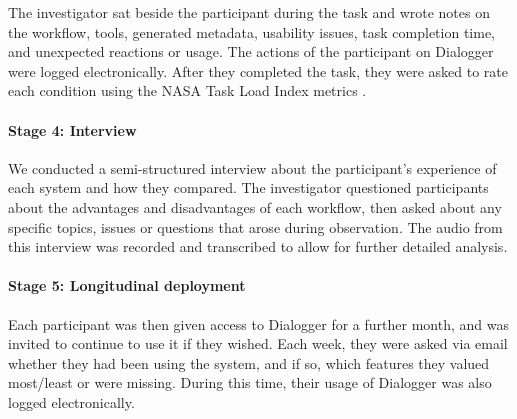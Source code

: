     The investigator sat beside the participant during the task and wrote notes on the workflow, tools, generated
    metadata, usability issues, task completion time, and unexpected reactions or usage.
    The actions of the participant on Dialogger were logged electronically. After they completed the task, they were
    asked to rate each condition using the NASA Task Load Index metrics \citep{Hart1988}.


\paragraph{Stage 4: Interview}
    We conducted a semi-structured interview about the participant's experience of each system and how they compared.
    The investigator questioned participants about the advantages and disadvantages of each workflow, then asked about
    any specific topics, issues or questions that arose during observation. The audio from this interview was
    recorded and transcribed to allow for further detailed analysis.


\paragraph{Stage 5: Longitudinal deployment}
    Each participant was then given access to Dialogger for a further month, and was invited to continue to use it if
    they wished. Each week, they were asked via email whether they had been using the system, and if so, which features
    they valued most/least or were missing.  During this time, their usage of Dialogger was also logged electronically.


